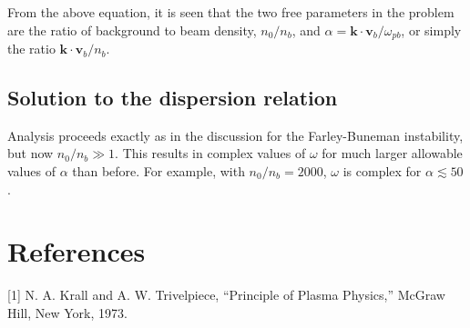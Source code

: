 \documentclass[12pt]{article}
\newcommand{\mb}{\mathbf}
\begin{document}
From the above equation, it is seen that the two free parameters in the problem are the ratio of background to beam density, $n_0/n_b$, and $\alpha = \mb{k} \cdot \mb{v}_b/\omega_{pb}$, or simply the ratio $\mb{k} \cdot \mb{v}_b/n_b$.

\subsection*{Solution to the dispersion relation}

Analysis proceeds exactly as in the discussion for the Farley-Buneman instability, but now $n_0/n_b \gg 1$. This results in complex values of $\omega$ for much larger allowable values of $\alpha$ than before. For example, with $n_0/n_b = 2000$, $\omega$ is complex for $\alpha \lesssim 50$.

\section*{References}
[1] N. A. Krall and A. W. Trivelpiece, ``Principle of Plasma Physics,'' McGraw Hill, New York, 1973.
\end{document}
